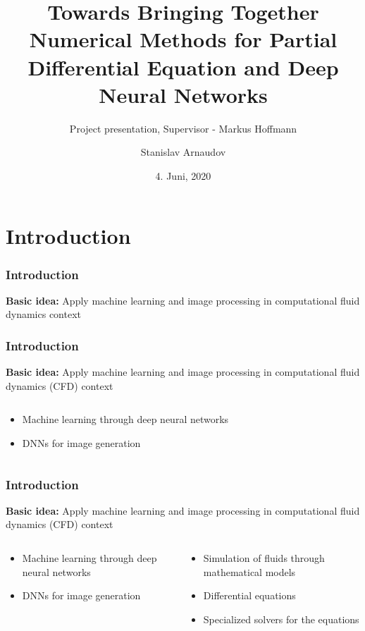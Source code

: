 \documentclass[18pt, xcolor=table]{beamer}
\title[Research Project]{Towards Bringing Together Numerical Methods for Partial Differential Equation and Deep Neural Networks}
\subtitle{Project presentation, Supervisor - Markus Hoffmann}
\author{Stanislav Arnaudov}
\institute{Chair for Computer Architecture and Parallel Processing}
\date{4. Juni, 2020}
\begin{document}
\begin{frame}
 \titlepage
\end{frame}

\section{Introduction}


\begin{frame}[t]
  \frametitle{Introduction}
  \textbf{Basic idea:} Apply machine learning and image processing in computational fluid dynamics context
\end{frame}

\begin{frame}[t]
  \frametitle{Introduction}
  \textbf{Basic idea:} Apply machine learning and image processing in computational fluid dynamics (CFD) context
  \begin{columns}[t]
    \begin{column}{0.5\textwidth}
      \begin{itemize}
      \item Machine learning through deep neural networks
      \item DNNs for image generation
      \end{itemize}
    \end{column}
    \begin{column}{0.5\textwidth}
    \end{column}
  \end{columns}
\end{frame}

\begin{frame}[t]
  \frametitle{Introduction}
  \textbf{Basic idea:} Apply machine learning and image processing in computational fluid dynamics (CFD) context
  \begin{columns}[t]
    \begin{column}{0.5\textwidth}
      \begin{itemize}
      \item Machine learning through deep neural networks
      \item DNNs for image generation
      \end{itemize}
    \end{column}
    \begin{column}{0.5\textwidth}
      \begin{itemize}
      \item Simulation of fluids through mathematical models
      \item Differential equations
      \item Specialized solvers for the equations
      \end{itemize}
    \end{column}
  \end{columns}
\end{frame}
\end{document}
